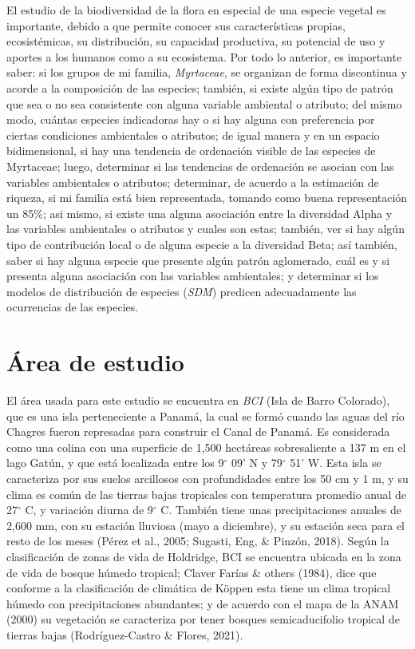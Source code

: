 \documentclass[11pt,]{article}
\begin{document}
El estudio de la biodiversidad de la flora en especial de una especie
vegetal es importante, debido a que permite conocer sus características
propias, ecosistémicas, su distribución, su capacidad productiva, su
potencial de uso y aportes a los humanos como a su ecosistema. Por todo
lo anterior, es importante saber: si los grupos de mi familia,
\emph{Myrtaceae}, se organizan de forma discontinua y acorde a la
composición de las especies; también, si existe algún tipo de patrón que
sea o no sea consistente con alguna variable ambiental o atributo; del
mismo modo, cuántas especies indicadoras hay o si hay alguna con
preferencia por ciertas condiciones ambientales o atributos; de igual
manera y en un espacio bidimensional, si hay una tendencia de ordenación
visible de las especies de Myrtaceae; luego, determinar si las
tendencias de ordenación se asocian con las variables ambientales o
atributos; determinar, de acuerdo a la estimación de riqueza, si mi
familia está bien representada, tomando como buena representación un
85\%; asi mismo, si existe una alguna asociación entre la diversidad
Alpha y las variables ambientales o atributos y cuales son estas;
también, ver si hay algún tipo de contribución local o de alguna especie
a la diversidad Beta; así también, saber si hay alguna especie que
presente algún patrón aglomerado, cuál es y si presenta alguna
asociación con las variables ambientales; y determinar si los modelos de
distribución de especies (\emph{SDM}) predicen adecuadamente las
ocurrencias de las especies.

\section{Área de estudio}\label{uxe1rea-de-estudio}

El área usada para este estudio se encuentra en \emph{BCI} (Isla de
Barro Colorado), que es una isla perteneciente a Panamá, la cual se
formó cuando las aguas del río Chagres fueron represadas para construir
el Canal de Panamá. Es considerada como una colina con una superficie de
1,500 hectáreas sobresaliente a 137 m en el lago Gatún, y que está
localizada entre los 9\(^\circ\) 09' N y 79\(^\circ\) 51' W. Esta isla
se caracteriza por sus suelos arcillosos con profundidades entre los 50
cm y 1 m, y su clima es común de las tierras bajas tropicales con
temperatura promedio anual de 27\(^\circ\) C, y variación diurna de
9\(^\circ\) C. También tiene unas precipitaciones anuales de 2,600 mm,
con su estación lluviosa (mayo a diciembre), y su estación seca para el
resto de los meses (Pérez et al., 2005; Sugasti, Eng, \& Pinzón, 2018).
Según la clasificación de zonas de vida de Holdridge, BCI se encuentra
ubicada en la zona de vida de bosque húmedo tropical; Claver Farías \&
others (1984), dice que conforme a la clasificación de climática de
Köppen esta tiene un clima tropical húmedo con precipitaciones
abundantes; y de acuerdo con el mapa de la ANAM (2000) su vegetación se
caracteriza por tener bosques semicaducifolio tropical de tierras bajas
(Rodríguez-Castro \& Flores, 2021).
\end{document}
